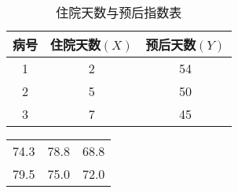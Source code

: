 \documentclass[10pt,a4paper]{ctexart}
\begin{document}
	\begin{table*}[h]
		\centering
		\caption{住院天数与预后指数表}
		\begin{tabular*}{\hsize}{@{}@{\extracolsep{\fill}}ccc@{}}
			\toprule
			病号&住院天数$(X)$&预后天数$(Y)$\\
			\midrule
			1&2&54\\2&5&50\\3&7&45\\
			\bottomrule
		\end{tabular*}
		\label{tbl:table1}
	\end{table*}
    \begin{table}[h]
    	\begin{tabular}{ccc}
    		74.3&78.8&68.8\\
    		79.5&75.0&72.0\\
    	\end{tabular}
    \end{table}
	
\end{document}
